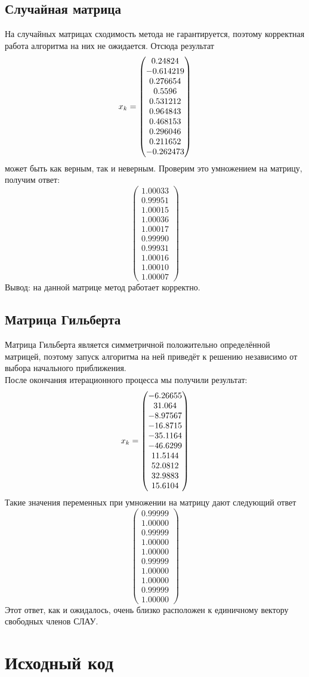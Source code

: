 \documentclass[../../report.tex]{subfiles}
\begin{document}
\subsection{Случайная матрица}
На случайных матрицах сходимость метода не гарантируется, 
поэтому корректная работа алгоритма на них не ожидается. Отсюда результат
\[
x_k = \begin{pmatrix} 0.24824 \\ -0.614219 \\ 0.276654 \\ 0.5596 \\ 0.531212 \\ 0.964843 \\ 0.468153 \\ 0.296046 \\ 0.211652 \\ -0.262473 \end{pmatrix}
\]
может быть как верным, так и неверным. Проверим это умножением на матрицу, получим ответ:
\[
\begin{pmatrix}
  1.00033 \\
  0.99951 \\
  1.00015 \\
  1.00036 \\
  1.00017 \\
  0.99990 \\
  0.99931 \\
  1.00016 \\
  1.00010 \\
  1.00007
\end{pmatrix}
\]
Вывод: на данной матрице метод работает корректно.

\subsection{Матрица Гильберта}
Матрица Гильберта является симметричной положительно определённой 
матрицей, поэтому запуск алгоритма на ней приведёт к решению 
независимо от выбора начального приближения. \\
После окончания итерационного процесса мы получили результат:
\[
x_k = \begin{pmatrix} -6.26655 \\ 31.064 \\ -8.97567 \\ -16.8715 \\ -35.1164 \\ -46.6299 \\ 11.5144 \\ 52.0812 \\ 32.9883 \\ 15.6104 \end{pmatrix}
\]
Такие значения переменных при умножении на матрицу дают следующий ответ
\[
\begin{pmatrix}
  0.99999 \\
  1.00000 \\
  0.99999 \\
  1.00000 \\
  1.00000 \\
  0.99999 \\
  1.00000 \\
  1.00000 \\
  0.99999 \\
  1.00000
\end{pmatrix}
\]
Этот ответ, как и ожидалось, очень близко расположен к единичному вектору свободных членов СЛАУ.

\section{Исходный код}
\end{document}
